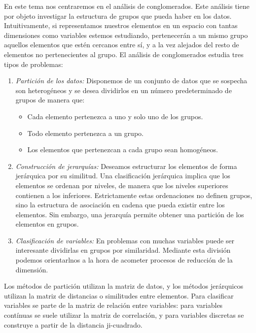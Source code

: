 En este tema nos centraremos en el an\'alisis de conglomerados. Este an\'alisis tiene por objeto investigar la estructura de grupos que pueda haber en los datos. Intuitivamente, si representamos nuestros elementos en un espacio con tantas dimensiones como variables estemos estudiando, pertenecer\'an a un mismo grupo aquellos elementos que est\'en cercanos entre s\'i, y a la vez alejados del resto de elementos no pertenecientes al grupo. El an\'alisis de conglomerados estudia tres tipos de problemas:
\begin{enumerate}
\item \textit{Partici\'on de los datos:} Disponemos de un conjunto de datos que se sospecha son heterog\'eneos y se desea dividirlos en un n\'umero predeterminado de grupos de manera que:
\begin{itemize}
\item Cada elemento pertenezca a uno y solo uno de los grupos.
\item Todo elemento pertenezca a un grupo.
\item Los elementos que pertenezcan a cada grupo sean homog\'eneos.
\end{itemize}
\item \textit{Construcci\'on de jerarqu\'ias:} Deseamos estructurar los elementos de forma jer\'arquica por su similitud. Una clasificaci\'on jer\'arquica implica que los elementos se ordenan por niveles, de manera que los niveles superiores contienen a los inferiores. Estrictamente estas ordenaciones no definen grupos, sino la estructura de asociaci\'on en cadena que pueda existir entre los elementos. Sin embargo, una jerarqu\'ia permite obtener una partici\'on de los elementos en grupos.
\item \textit{Clasificaci\'on de variables:} En problemas con muchas variables puede ser interesante dividirlas en grupos por similaridad. Mediante esta divisi\'on podemos orientarlnos a la hora de acometer procesos de reducci\'on de la dimensi\'on.
\end{enumerate}

Los m\'etodos de partici\'on utilizan la matriz de datos, y los m\'etodos jer\'arquicos utilizan la matriz de distancias o similitudes entre elementos. Para clasificar variables se parte de la matriz de relaci\'on entre variables: para variables cont\'inuas se suele utilizar la matriz de correlaci\'on, y para variables discretas se construye a partir de la distancia ji-cuadrado.


